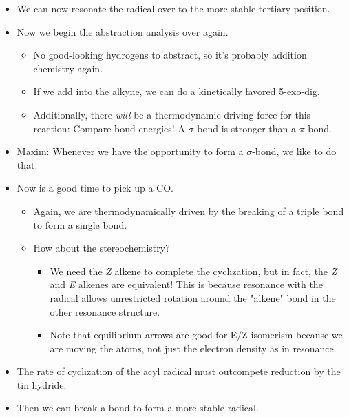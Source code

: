\documentclass[../notes.tex]{subfiles}
\begin{document}
\begin{itemize}
\begin{itemize}
        \item That's why Mo wanted the stereochemistry indicated; to show that the attack will lead to a syn product.
        \item Indeed, the \emph{cis}-fused 5-membered ring is \SI{15}{\kilo\calorie\per\mole} more stable than the \emph{trans} equivalent.
    \end{itemize}
    \item We can now resonate the radical over to the more stable tertiary position.
    \item Now we begin the abstraction analysis over again.
    \begin{itemize}
        \item No good-looking hydrogens to abstract, so it's probably addition chemistry again.
        \item If we add into the alkyne, we can do a kinetically favored 5-exo-dig.
        \item Additionally, there \emph{will} be a thermodynamic driving force for this reaction: Compare bond energies! A  $\sigma$-bond is stronger than a  $\pi$-bond.
    \end{itemize}
    \item Maxim: Whenever we have the opportunity to form a  $\sigma$-bond, we like to do that.
    \item Now is a good time to pick up a CO.
    \begin{itemize}
        \item Again, we are thermodynamically driven by the breaking of a  triple bond to form a  single bond.
        \item How about the stereochemistry?
        \begin{itemize}
            \item We need the \emph{Z} alkene to complete the cyclization, but in fact, the \emph{Z} and \emph{E} alkenes are equivalent! This is because resonance with the radical allows unrestricted rotation around the "alkene" bond in the other resonance structure.
            \item Note that equilibrium arrows are good for E/Z isomerism because we are moving the atoms, not just the electron density as in resonance.
        \end{itemize}
    \end{itemize}
    \item The rate of cyclization of the acyl radical must outcompete reduction by the tin hydride.
    \item Then we can break a bond to form a more stable radical.

\end{itemize}
\end{document}
